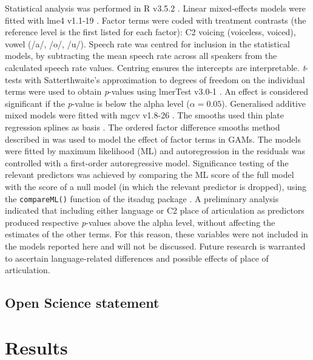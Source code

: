 \documentclass[12pt,]{article}
\begin{document}
Statistical analysis was performed in R v3.5.2 \citep{r-core-team2018}.
Linear mixed-effects models were fitted with lme4 v1.1-19
\citep{bates2015}. Factor terms were coded with treatment contrasts (the
reference level is the first listed for each factor): C2 voicing
(voiceless, voiced), vowel (/a/, /o/, /u/). Speech rate was centred for
inclusion in the statistical models, by subtracting the mean speech rate
across all speakers from the calculated speech rate values. Centring
ensures the intercepts are interpretable. \emph{t}-tests with
Satterthwaite's approximation to degrees of freedom on the individual
terms were used to obtain \emph{p}-values using lmerTest v3.0-1
\citep{kuznetsova2017, luke2017}. An effect is considered significant if
the \emph{p}-value is below the alpha level (\(\alpha = 0.05\)).
Generalised additive mixed models were fitted with mgcv v1.8-26
\citep{wood2011, wood2017}. The smooths used thin plate regression
splines as basis \citep{wood2003}. The ordered factor difference smooths
method described in \citet{soskuthy2017, wieling2018} was used to model
the effect of factor terms in GAMs. The models were fitted by maximum
likelihood (ML) and autoregression in the residuals was controlled with
a first-order autoregressive model. Significance testing of the relevant
predictors was achieved by comparing the ML score of the full model with
the score of a null model (in which the relevant predictor is dropped),
using the \texttt{compareML()} function of the itsadug package
\citep{van-rij2017}. A preliminary analysis indicated that including
either language or C2 place of articulation as predictors produced
respective \emph{p}-values above the alpha level, without affecting the
estimates of the other terms. For this reason, these variables were not
included in the models reported here and will not be discussed. Future
research is warranted to ascertain language-related differences and
possible effects of place of articulation.

\hypertarget{open-science-statement}{%
\subsection{Open Science statement}\label{open-science-statement}}

\hypertarget{results}{%
\section{Results}\label{results}}

\label{s:results}
\end{document}
